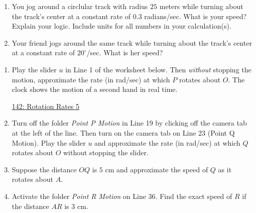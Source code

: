 \documentclass{ximera}
\begin{document}
\begin{question} \label{Q9df9sttr4rt}
\begin{enumerate}
\item You jog around a circlular track with radius $25$ meters while turning about the track's center at a constant rate of $0.3$ radians/sec. What is your speed? Explain your logic. Include units for all numbers in your calculation(s). 

\item Your friend jogs around the same track while turning about the track's center at a constant rate of $20^\circ$/sec. What is her speed?

\end{enumerate}
\end{question}



\begin{question}  \label{Q3245rghh5ty5t}
\begin{enumerate}

\item Play the slider $u$ in Line 1 of the worksheet below. Then \emph{without} stopping the motion, approximate the rate (in rad/sec) at which $P$ rotates about $O$. The clock shows the motion of a second hand in real time.

\begin{onlineOnly}
\begin{center}
\end{center}
\end{onlineOnly}

\href{https://www.desmos.com/calculator/9on2xpcvta}{142: Rotation Rates 5}

\item Turn off the folder \emph{Point P Motion} in Line 19 by clicking off the camera tab at the left of the line. Then turn on the camera tab on Line 23 (Point Q Motion). Play the slider $u$ and approximate the rate (in rad/sec) at which $Q$ rotates about $O$ without stopping the slider.

\item Suppose the distance $OQ$ is $5$ cm and approximate the speed of $Q$ as it rotates about $A$.

\item Activate the folder \emph{Point R Motion} on Line 36. Find the exact speed of $R$ if the distance $AR$ is $3$ cm. 

\end{enumerate}

\end{question}
\end{document}
